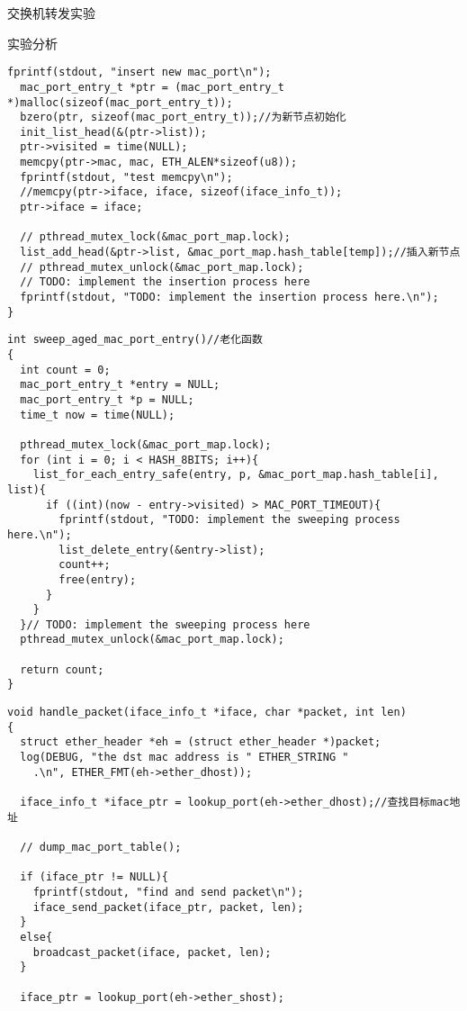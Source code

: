 \documentclass{article} %
\begin{document}
\begin{section}{交换机转发实验}
\begin{subsection}{实验分析}
\begin{enumerate}[1)]
\begin{lstlisting}[language={[ANSI]C}]
  fprintf(stdout, "insert new mac_port\n");
  mac_port_entry_t *ptr = (mac_port_entry_t *)malloc(sizeof(mac_port_entry_t));
  bzero(ptr, sizeof(mac_port_entry_t));//为新节点初始化
  init_list_head(&(ptr->list));
  ptr->visited = time(NULL);
  memcpy(ptr->mac, mac, ETH_ALEN*sizeof(u8));
  fprintf(stdout, "test memcpy\n");
  //memcpy(ptr->iface, iface, sizeof(iface_info_t));
  ptr->iface = iface;

  // pthread_mutex_lock(&mac_port_map.lock);	
  list_add_head(&ptr->list, &mac_port_map.hash_table[temp]);//插入新节点		
  // pthread_mutex_unlock(&mac_port_map.lock);
  // TODO: implement the insertion process here
  fprintf(stdout, "TODO: implement the insertion process here.\n");
}
					\end{lstlisting}
					\begin{lstlisting}[language={[ANSI]C}]
int sweep_aged_mac_port_entry()//老化函数
{
  int count = 0;
  mac_port_entry_t *entry = NULL;
  mac_port_entry_t *p = NULL;
  time_t now = time(NULL);

  pthread_mutex_lock(&mac_port_map.lock);
  for (int i = 0; i < HASH_8BITS; i++){
	list_for_each_entry_safe(entry, p, &mac_port_map.hash_table[i], list){
	  if ((int)(now - entry->visited) > MAC_PORT_TIMEOUT){
	    fprintf(stdout, "TODO: implement the sweeping process here.\n");
	    list_delete_entry(&entry->list);
	    count++;
	    free(entry);
	  }
	}
  }// TODO: implement the sweeping process here
  pthread_mutex_unlock(&mac_port_map.lock);

  return count;
}
					\end{lstlisting}
					\begin{lstlisting}[language={[ANSI]C}]
void handle_packet(iface_info_t *iface, char *packet, int len)
{
  struct ether_header *eh = (struct ether_header *)packet;
  log(DEBUG, "the dst mac address is " ETHER_STRING "
  	.\n", ETHER_FMT(eh->ether_dhost));
  
  iface_info_t *iface_ptr = lookup_port(eh->ether_dhost);//查找目标mac地址

  // dump_mac_port_table();

  if (iface_ptr != NULL){
	fprintf(stdout, "find and send packet\n");
	iface_send_packet(iface_ptr, packet, len);
  }
  else{
	broadcast_packet(iface, packet, len);
  }

  iface_ptr = lookup_port(eh->ether_shost);


\end{lstlisting}
\end{enumerate}
\end{subsection}
\end{section}
\end{document}
